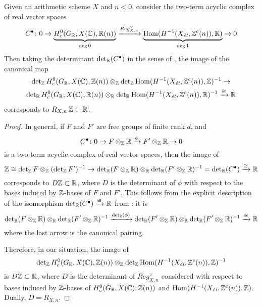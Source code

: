 \documentclass[draft]{article}
\numberwithin{equation}{section}
\begin{document}
\begin{proposition}
  \label{prop:trivialization-of-free-part}
  Given an arithmetic scheme $X$ and $n < 0$, consider the two-term acyclic
  complex of real vector spaces
  \[ C^\bullet\colon
    0 \to
    \underbrace{H^0_c (G_\RR, X(\CC), \RR(n))}_{\deg 0}
    \xrightarrow{Reg_{X,n}^\vee}
    \underbrace{\Hom (H^{-1} (X_\et, \ZZ^c (n)), \RR)}_{\deg 1}
    \to 0 \]
  Then taking the determinant $\det_\RR (C^\bullet)$ in the sense of
  \cite{Knudsen-Mumford-1976}, the image of the canonical map
  \begin{multline*}
    \det_\ZZ H^0_c (G_\RR, X(\CC), \ZZ(n)) \otimes_\ZZ
    \det_\ZZ \Hom (H^{-1} (X_\et, \ZZ^c (n)), \ZZ)^{-1} \to \\
    \det_\RR H^0_c (G_\RR, X(\CC), \RR (n)) \otimes_\RR
    \det_\RR \Hom (H^{-1} (X_\et, \ZZ^c (n)), \RR)^{-1}
    \xrightarrow{\cong} \RR
  \end{multline*}
  corresponds to $R_{X,n}\,\ZZ \subset \RR$.

  \begin{proof}
    In general, if $F$ and $F'$ are free groups of finite rank $d$, and
    $$C^\bullet\colon 0 \to F\otimes_\ZZ \RR \xrightarrow{\phi} F'\otimes_\ZZ \RR \to 0$$
    is a two-term acyclic complex of real vector spaces, then the image of
    \[ \ZZ \cong \det_\ZZ F \otimes_\ZZ (\det_\ZZ F')^{-1} \to
      \det_\RR (F\otimes_\ZZ \RR) \otimes_\RR \det_\RR (F' \otimes_\ZZ \RR)^{-1}
      = \det_\RR (C^\bullet) \xrightarrow{\cong} \RR \]
    corresponds to $D\ZZ \subset \RR$, where $D$ is the determinant of $\phi$ with
    respect to the bases induced by $\ZZ$-bases of $F$ and $F'$.
    This follows from the explicit description of the isomorphism
    $\det_\RR (C^\bullet) \xrightarrow{\cong} \RR$ from
    \cite[p.\,33]{Knudsen-Mumford-1976}: it is
    \[ \det_\RR (F \otimes_\ZZ \RR) \otimes_\RR
      \det_\RR (F'\otimes_\ZZ \RR)^{-1} \xrightarrow{\det_\RR (\phi)}
      \det_\RR (F' \otimes_\ZZ \RR) \otimes_\RR
      \det_\RR (F' \otimes_\ZZ \RR)^{-1} \xrightarrow{\cong} \RR \]
    where the last arrow is the canonical pairing.

    Therefore, in our situation, the image of
    \[ \det_\ZZ H^0_c (G_\RR, X(\CC), \ZZ(n)) \otimes_\ZZ
      \det_\ZZ \Hom (H^{-1} (X_\et, \ZZ^c (n)), \ZZ)^{-1} \]
    is $D \ZZ \subset \RR$, where $D$ is the determinant of $Reg_{X,n}^\vee$
    considered with respect to bases induced by $\ZZ$-bases of
    $H^0_c (G_\RR, X(\CC), \ZZ(n))$ and
    $\Hom (H^{-1} (X_\et, \ZZ^c (n)), \ZZ)$. Dually, $D = R_{X,n}$.
  \end{proof}
\end{proposition}
\end{document}
